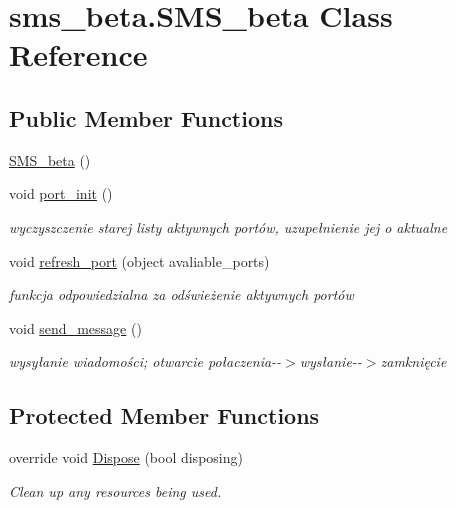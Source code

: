 \hypertarget{classsms__beta_1_1_s_m_s__beta}{
\section{sms\_\-beta.SMS\_\-beta Class Reference}
\label{classsms__beta_1_1_s_m_s__beta}
}
\subsection*{Public Member Functions}
\begin{DoxyCompactItemize}
\item 
\hyperlink{classsms__beta_1_1_s_m_s__beta_ae11024545823375efc017b72a6f1c90d}{SMS\_\-beta} ()
\item 
void \hyperlink{classsms__beta_1_1_s_m_s__beta_aa814b2e463635840f66b8ae38202fee5}{port\_\-init} ()
\begin{DoxyCompactList}\small\item\em wyczyszczenie starej listy aktywnych portów, uzupełnienie jej o aktualne \item\end{DoxyCompactList}\item 
void \hyperlink{classsms__beta_1_1_s_m_s__beta_aa423556b3faefda78d5afc73d501f429}{refresh\_\-port} (object avaliable\_\-ports)
\begin{DoxyCompactList}\small\item\em funkcja odpowiedzialna za odświeżenie aktywnych portów \item\end{DoxyCompactList}\item 
void \hyperlink{classsms__beta_1_1_s_m_s__beta_ae9b60e09589d0bd9a8ebbd9d73021f89}{send\_\-message} ()
\begin{DoxyCompactList}\small\item\em wysyłanie wiadomości; otwarcie połaczenia-\/-\/$>$wysłanie-\/-\/$>$zamknięcie \item\end{DoxyCompactList}\end{DoxyCompactItemize}
\subsection*{Protected Member Functions}
\begin{DoxyCompactItemize}
\item 
override void \hyperlink{classsms__beta_1_1_s_m_s__beta_a9449c898dcbad1b6dddd7055b6d2c281}{Dispose} (bool disposing)
\begin{DoxyCompactList}\small\item\em Clean up any resources being used. \item\end{DoxyCompactList}\end{DoxyCompactItemize}


